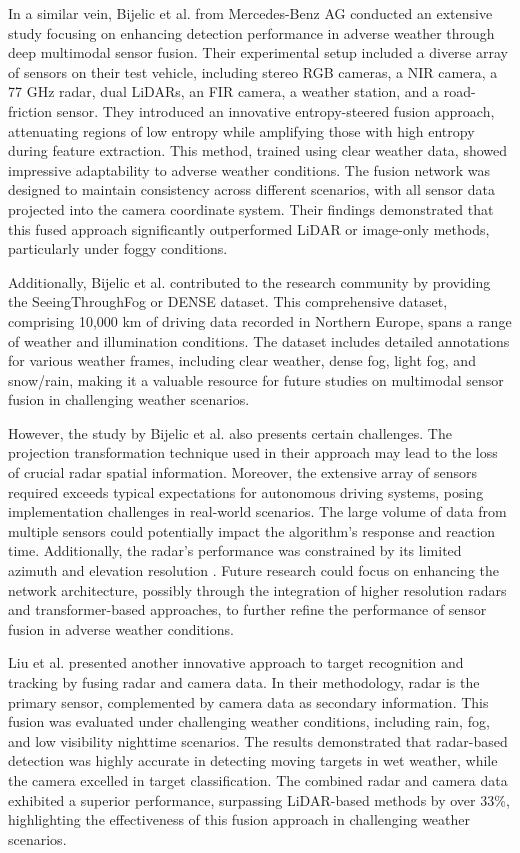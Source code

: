 \documentclass[report.tex]{subfiles}
\begin{document}
    In a similar vein, Bijelic et al. \cite{bijelic2020seeing} from Mercedes-Benz AG conducted an extensive study focusing on enhancing detection performance in adverse weather through deep multimodal sensor fusion. Their experimental setup included a diverse array of sensors on their test vehicle, including stereo RGB cameras, a NIR camera, a 77 GHz radar, dual LiDARs, an FIR camera, a weather station, and a road-friction sensor. They introduced an innovative entropy-steered fusion approach, attenuating regions of low entropy while amplifying those with high entropy during feature extraction. This method, trained using clear weather data, showed impressive adaptability to adverse weather conditions. The fusion network was designed to maintain consistency across different scenarios, with all sensor data projected into the camera coordinate system. Their findings demonstrated that this fused approach significantly outperformed LiDAR or image-only methods, particularly under foggy conditions.

    Additionally, Bijelic et al. \cite{bijelic2020seeing} contributed to the research community by providing the SeeingThroughFog or DENSE dataset. This comprehensive dataset, comprising 10,000 km of driving data recorded in Northern Europe, spans a range of weather and illumination conditions. The dataset includes detailed annotations for various weather frames, including clear weather, dense fog, light fog, and snow/rain, making it a valuable resource for future studies on multimodal sensor fusion in challenging weather scenarios.

    However, the study by Bijelic et al. \cite{bijelic2020seeing} also presents certain challenges. The projection transformation technique used in their approach may lead to the loss of crucial radar spatial information. Moreover, the extensive array of sensors required exceeds typical expectations for autonomous driving systems, posing implementation challenges in real-world scenarios. The large volume of data from multiple sensors could potentially impact the algorithm's response and reaction time. Additionally, the radar's performance was constrained by its limited azimuth and elevation resolution \cite{zhang2023perception}. Future research could focus on enhancing the network architecture, possibly through the integration of higher resolution radars and transformer-based approaches, to further refine the performance of sensor fusion in adverse weather conditions.

    Liu et al. \cite{liu2021robust} presented another innovative approach to target recognition and tracking by fusing radar and camera data. In their methodology, radar is the primary sensor, complemented by camera data as secondary information. This fusion was evaluated under challenging weather conditions, including rain, fog, and low visibility nighttime scenarios. The results demonstrated that radar-based detection was highly accurate in detecting moving targets in wet weather, while the camera excelled in target classification. The combined radar and camera data exhibited a superior performance, surpassing LiDAR-based methods by over 33\%, highlighting the effectiveness of this fusion approach in challenging weather scenarios.
\end{document}
